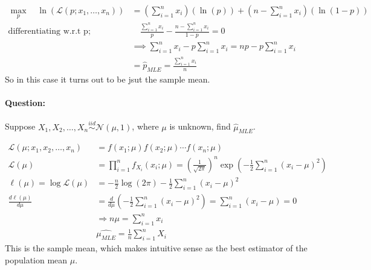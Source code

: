 \documentclass[12pt,a4paper]{article}
\begin{document}
     \begin{align*}
           \max_{p}  \quad \ln(\mathcal{L}(p;x_{1},\ldots,x_{n}))&= (\sum_{i=1}^{n}x_{i})(\ln(p))+(n-\sum_{i=1}^{n}x_{i} )(\ln(1-p))\\
           \text{differentiating w.r.t p}; & \quad \frac{\sum_{i=1}^{n} x_{i}}{p} - \frac{n-\sum_{i=1}^{n} x_{i}}{1-p}=0\\
           &\implies \sum_{i=1}^{n} x_{i} - p\sum_{i=1}^{n} x_{i}= np - p\sum_{i=1}^{n} x_{i}\\
           &=\hat{p}_{MLE}=\frac{\sum_{i=1}^{n} x_{i}}{n}
    \end{align*}
     So in this case it turns out to be jsut the sample mean.
    
     \paragraph{Question:}
     Suppose \(X_{1},X_{2},\ldots,X_{n}\overset{iid}{\sim}\mathcal{N}(\mu ,1)\), where \(\mu\) is unknown, find \(\hat{\mu}_{MLE}\).
     
    \begin{align*}
        \mathcal{L}(\mu ; x_{1},x_{2},\ldots,x_{n})&=f(x_{1};\mu)f(x_{2};\mu) \cdots f(x_{n};\mu) \\
        \mathcal{L}(\mu) &= \prod_{i=1}^n f_{X_i}(x_i; \mu) = \left(\frac{1}{\sqrt{2\pi}}\right)^n \exp\left(-\frac{1}{2} \sum_{i=1}^n (x_i - \mu)^2\right)\\
        \ell(\mu) = \log \mathcal{L}(\mu) &= -\frac{n}{2} \log(2\pi) - \frac{1}{2} \sum_{i=1}^n (x_i - \mu)^2\\\frac{d\ell(\mu)}{d\mu} &= \frac{d}{d\mu} \left(-\frac{1}{2} \sum_{i=1}^n (x_i - \mu)^2\right) = \sum_{i=1}^n (x_i - \mu)=0\\
        &\Rightarrow n\mu = \sum_{i=1}^n x_i\\
        &\hat{\mu_{MLE}} = \frac{1}{n} \sum_{i=1}^n X_i        
    \end{align*} 
    This is the sample mean, which makes intuitive sense as the best estimator of the population mean \(\mu\). 
\end{document}
